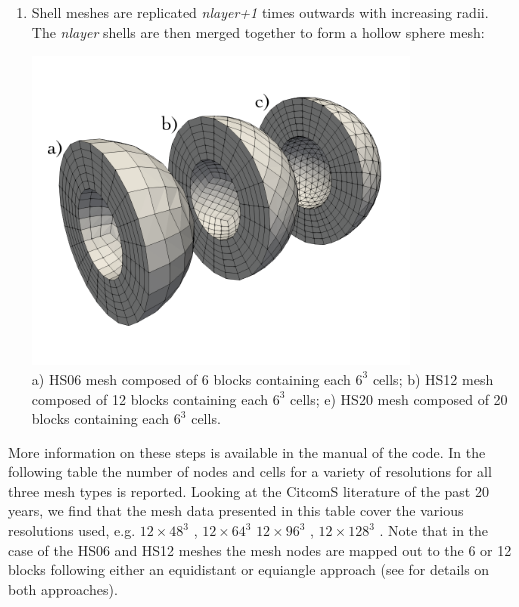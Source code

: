 \begin{enumerate}
\item Shell meshes are replicated {\sl nlayer+1} times outwards with increasing radii. 
The {\sl nlayer} shells are then merged together to form a hollow sphere mesh:
\begin{center}
\includegraphics[width=10cm]{images/ghost/f03_3HS}\\
{\captionfont a) HS06 mesh composed of 6 blocks containing each $6^3$ cells; 
b) HS12 mesh composed of 12 blocks containing each 
$6^3$ cells; e) HS20 mesh composed of 20 blocks containing each $6^3$ cells.}
\end{center}

\end{enumerate}



More information on these steps is available in the manual of the code.
In the following table the number of nodes and cells for a variety of resolutions 
for all three mesh types is reported. Looking at the CitcomS literature of the past 20 years, we find that 
the mesh data presented in this table cover the various resolutions used, e.g.
$12\times48^3$ \cite{mczh04,arfw14}, $12\times64^3$ \cite{budt14}
$12\times96^3$ \cite{bumb10}, $12\times128^3$ \cite{beck06,wele16,welm16}.
Note that in the case of the HS06 and HS12 meshes the mesh nodes are mapped out to the 6 or 12 blocks 
following either an equidistant or equiangle approach (see \cite{puli07}
for details on both approaches). 

